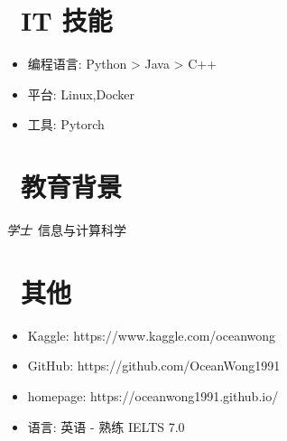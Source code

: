 \documentclass{resume}
\begin{document}
\section{\faCogs\ IT 技能}
\begin{itemize}[parsep=0.5ex]
  \item 编程语言: Python > Java > C++
  \item 平台: Linux,Docker
  \item 工具: Pytorch
\end{itemize}

\section{\faGraduationCap\  教育背景}
\textit{学士}\ 信息与计算科学



\section{\faInfo\ 其他}
\begin{itemize}[parsep=0.5ex]
  \item Kaggle: https://www.kaggle.com/oceanwong
  \item GitHub: https://github.com/OceanWong1991
  \item homepage: https://oceanwong1991.github.io/
  \item 语言: 英语 - 熟练 IELTS 7.0
\end{itemize}
\end{document}
